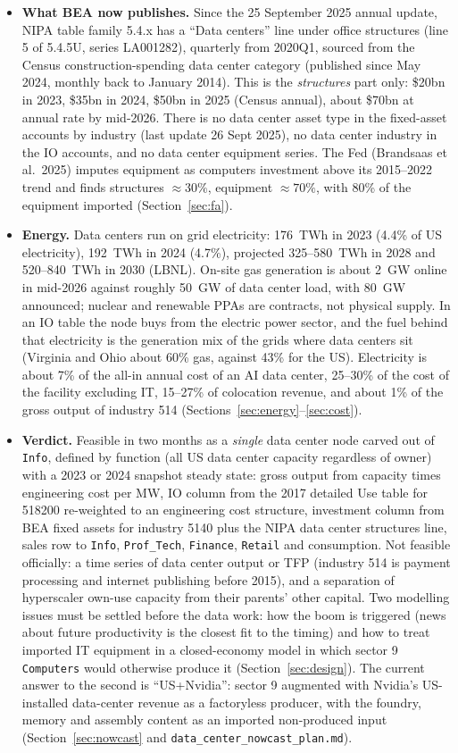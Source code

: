 \documentclass[11pt]{article}
\begin{document}
\begin{itemize}
  \item \textbf{What BEA now publishes.} Since the 25 September 2025 annual update, NIPA table family 5.4.x has a ``Data centers'' line under office structures (line 5 of 5.4.5U, series LA001282), quarterly from 2020Q1, sourced from the Census construction-spending data center category (published since May 2024, monthly back to January 2014). This is the \emph{structures} part only: \$20bn in 2023, \$35bn in 2024, \$50bn in 2025 (Census annual), about \$70bn at annual rate by mid-2026. There is no data center asset type in the fixed-asset accounts by industry (last update 26 Sept 2025), no data center industry in the IO accounts, and no data center equipment series. The Fed (Brandsaas et al.\ 2025) imputes equipment as computers investment above its 2015--2022 trend and finds structures $\approx 30\%$, equipment $\approx 70\%$, with 80\% of the equipment imported (Section~\ref{sec:fa}).
  \item \textbf{Energy.} Data centers run on grid electricity: 176~TWh in 2023 (4.4\% of US electricity), 192~TWh in 2024 (4.7\%), projected 325--580~TWh in 2028 and 520--840~TWh in 2030 (LBNL). On-site gas generation is about 2~GW online in mid-2026 against roughly 50~GW of data center load, with 80~GW announced; nuclear and renewable PPAs are contracts, not physical supply. In an IO table the node buys from the electric power sector, and the fuel behind that electricity is the generation mix of the grids where data centers sit (Virginia and Ohio about 60\% gas, against 43\% for the US). Electricity is about 7\% of the all-in annual cost of an AI data center, 25--30\% of the cost of the facility excluding IT, 15--27\% of colocation revenue, and about 1\% of the gross output of industry 514 (Sections~\ref{sec:energy}--\ref{sec:cost}).
  \item \textbf{Verdict.} Feasible in two months as a \emph{single} data center node carved out of \texttt{Info}, defined by function (all US data center capacity regardless of owner) with a 2023 or 2024 snapshot steady state: gross output from capacity times engineering cost per MW, IO column from the 2017 detailed Use table for 518200 re-weighted to an engineering cost structure, investment column from BEA fixed assets for industry 5140 plus the NIPA data center structures line, sales row to \texttt{Info}, \texttt{Prof\_Tech}, \texttt{Finance}, \texttt{Retail} and consumption. Not feasible officially: a time series of data center output or TFP (industry 514 is payment processing and internet publishing before 2015), and a separation of hyperscaler own-use capacity from their parents' other capital. Two modelling issues must be settled before the data work: how the boom is triggered (news about future productivity is the closest fit to the timing) and how to treat imported IT equipment in a closed-economy model in which sector 9 \texttt{Computers} would otherwise produce it (Section~\ref{sec:design}). The current answer to the second is ``US+Nvidia'': sector 9 augmented with Nvidia's US-installed data-center revenue as a factoryless producer, with the foundry, memory and assembly content as an imported non-produced input (Section~\ref{sec:nowcast} and \texttt{data\_center\_nowcast\_plan.md}).
\end{itemize}
\end{document}
